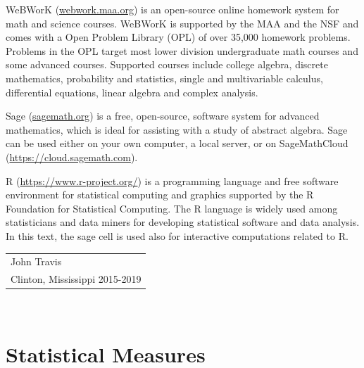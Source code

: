 \documentclass[10pt,]{book}
\numberwithin{equation}{section}
\begin{document}
\par
\hypertarget{p-11}{}%
WeBWorK (\href{http://webwork.maa.org}{webwork.maa.org}) is an open-source online homework system for math and science courses. WeBWorK is supported by the MAA and the NSF and comes with a Open Problem Library (OPL) of over 35,000 homework problems. Problems in the OPL target most lower division undergraduate math courses and some advanced courses. Supported courses include college algebra, discrete mathematics, probability and statistics, single and multivariable calculus, differential equations, linear algebra and complex analysis.%
\par
\hypertarget{p-12}{}%
Sage (\href{http://sagemath.org}{sagemath.org}) is a free, open-source, software system for advanced mathematics, which is ideal for assisting with a study of abstract algebra. Sage can be used either on your own computer, a local server, or on SageMathCloud (\href{https://cloud.sagemath.com}{https://cloud.sagemath.com}).%
\par
\hypertarget{p-13}{}%
R (\href{https://www.r-project.org/}{https://www.r-project.org/}) is a programming language and free software environment for statistical computing and graphics supported by the R Foundation for Statistical Computing. The R language is widely used among statisticians and data miners for developing statistical software and data analysis. In this text, the sage cell is used also for interactive computations related to R.%
\par\hfill\begin{tabular}{l@{}}
John Travis\\
Clinton, Mississippi 2015-2019
\end{tabular}\\\par
\setcounter{tocdepth}{1}
\renewcommand*\contentsname{Contents}
\tableofcontents
\mainmatter
%
%
\typeout{************************************************}
\typeout{************************************************}
%
\chapter[{Statistical Measures}]{Statistical Measures}\label{RepresentingData}
%
%
\typeout{************************************************}
\typeout{************************************************}
%
\end{document}
